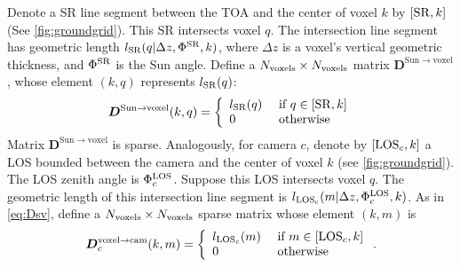 \documentclass[10pt,letterpaper]{article}
\newcommand{\OpDistance}{\bm{D}}
\begin{document}
Denote a SR line segment between the TOA and the center of voxel $k$
by $[{\rm SR},k]$ (See \cref{fig:groundgrid}). This SR intersects
voxel $q$. The intersection line segment has geometric length $l_{\rm
  SR}(q|\Delta z,\Phi^{\rm SR},k)$, where $\Delta z$ is a voxel's
vertical geometric thickness, and $\Phi^{\rm SR}$ is the Sun
angle. Define a \mbox{$N_{\rm voxels}\times N_{\rm voxels}$} matrix
$\OpDistance^{\mathrm{Sun \rightarrow voxel}}$, whose element $(k,q)$
represents $l_{\rm SR}(q)$:
\begin{equation}
  \OpDistance^{\mathrm{Sun \rightarrow voxel}}(k,q) =
  \left\{
    \begin{array}{ll}
      l_{\rm SR}(q) & \mbox{ if $q \in[{\rm SR},k]$} \\
      0  & \mbox{ otherwise}
      \label{eq:Dsv}
    \end{array}
  \right.
  \hspace{-0.05cm}
\end{equation}
Matrix $\OpDistance^{\mathrm{Sun \rightarrow voxel}}$ is sparse.
Analogously, for camera $c$, denote by $[{\rm LOS}_c,k]$ a LOS bounded
between the camera and the center of voxel $k$ (see
\cref{fig:groundgrid}).  The LOS zenith angle is $\Phi^{\rm LOS}_c$.
Suppose this LOS intersects voxel $q$. The geometric length of this
intersection line segment is $l_{\rm LOS_c}(m|\Delta z,\Phi^{\rm
  LOS}_c,k)$.  As in \cref{eq:Dsv}, define a $N_{\rm voxels}\times
N_{\rm voxels}$ sparse matrix whose element $(k,m)$ is
\begin{equation}
  \OpDistance^{\mathrm{voxel \rightarrow cam}}_c(k,m) =
  \left\{
    \begin{array}{ll}
      l_{{\rm LOS}_c}(m) & \mbox{ if $m \in[{\rm LOS}_c,k]$} \\
      0  & \mbox{ otherwise}
      \label{eq:Dvc}
    \end{array}
  \right.
  .
  \hspace{-0.05cm}
\end{equation}
\end{document}

